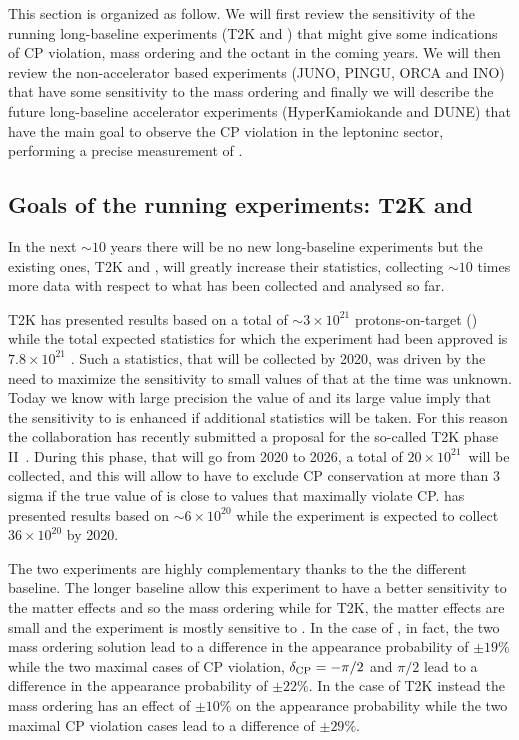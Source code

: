 This section is organized as follow. We will first review the sensitivity of the running long-baseline experiments (T2K and \nova) that might give some indications of CP violation, mass ordering and the \thatm octant in the coming years. We will then review the non-accelerator based experiments (JUNO, PINGU, ORCA and INO) that have some sensitivity to the mass ordering and finally we will describe the future long-baseline accelerator experiments (HyperKamiokande and DUNE) that have the main goal to observe the CP violation in the leptoninc sector, performing a precise measurement of \dcp. 


\subsection{Goals of the running experiments: T2K and \nova}
\label{sec:futuret2knova}
In the next $\sim10$ years there will be no new long-baseline experiments but the existing ones, T2K and \nova, will greatly increase their statistics, collecting $\sim10$ times more data with respect to what has been collected and analysed so far. 

T2K has presented results based on a total of $\sim3\times10^{21}$ protons-on-target (\pot) while the total expected statistics for which the experiment had been approved is $7.8\times10^{21}$ \pot. Such a statistics, that will be collected by 2020, was driven by the need to maximize the sensitivity to small values of \thint that at the time was unknown. Today we know with large precision the value of \thint and its large value imply that the sensitivity to \dcp is enhanced if additional statistics will be taken. For this reason the collaboration has recently submitted a proposal for the so-called T2K phase II~\cite{Abe:2016tii}. During this phase, that will go from 2020 to 2026, a total of  $20\times10^{21}$~\pot will be collected, and this will allow to have to exclude CP conservation at more than 3 sigma if the true value of \dcp is close to values that maximally violate CP.
\nova has presented results based on $\sim6\times10^20$ \pot while the experiment is expected to collect $36\times10^{20}$ \pot by 2020. 

The two experiments are highly complementary thanks to the the different baseline. The longer \nova baseline allow this experiment to have a better sensitivity to the matter effects and so the mass ordering while for T2K, the matter effects are small and the experiment is mostly sensitive to \dcp. In the case of \nova, in fact, the two mass ordering solution lead to a difference in the \nue appearance probability of $\pm19\%$ while the two maximal cases of CP violation, $\delta_{\mathrm{CP}}=-\pi/2$ and $\pi/2$ lead to a difference in the \nue appearance probability of $\pm22\%$. In the case of T2K instead the mass ordering has an effect of $\pm10\%$ on the appearance probability while the two maximal CP violation cases lead to a difference of $\pm29\%$. 

